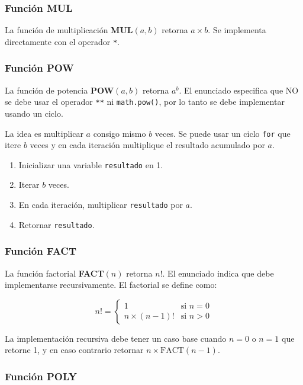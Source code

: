 \documentclass{article}
\begin{document}
\subsubsection{Función MUL}

La función de multiplicación \textbf{MUL}\((a,b)\) retorna \(a \times b\). Se implementa directamente con el operador \texttt{*}.

\subsubsection{Función POW}

La función de potencia \textbf{POW}\((a,b)\) retorna \(a^b\). El enunciado especifica que NO se debe usar el operador \texttt{**} ni \lstinline[style=pythonstyle]|math.pow()|, por lo tanto se debe implementar usando un ciclo. 

La idea es multiplicar \(a\) consigo mismo \(b\) veces. Se puede usar un ciclo \lstinline[style=pythonstyle]|for| que itere \(b\) veces y en cada iteración multiplique el resultado acumulado por \(a\).

\begin{enumerate}
  \item Inicializar una variable \texttt{resultado} en 1.
  \item Iterar \(b\) veces.
  \item En cada iteración, multiplicar \texttt{resultado} por \(a\).
  \item Retornar \texttt{resultado}.
\end{enumerate}

\subsubsection{Función FACT}

La función factorial \textbf{FACT}\((n)\) retorna \(n!\). El enunciado indica que debe implementarse recursivamente. El factorial se define como:

\[
n! = \begin{cases}
1 & \text{si } n = 0 \\
n \times (n-1)! & \text{si } n > 0
\end{cases}
\]

La implementación recursiva debe tener un caso base cuando \(n = 0\) o \(n = 1\) que retorne 1, y en caso contrario retornar \(n \times \text{FACT}(n-1)\).

\subsubsection{Función POLY}
\end{document}
